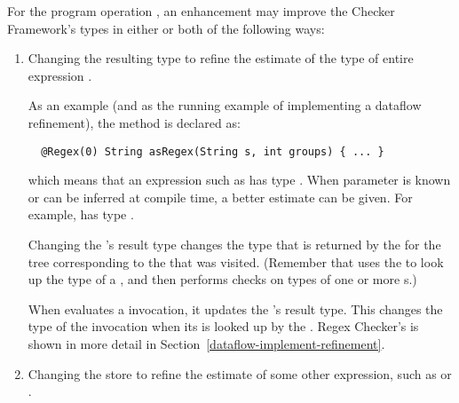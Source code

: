 For the program operation , an enhancement may improve the Checker
Framework's types in either or both of the following ways:
\begin{enumerate}
\item Changing the resulting type to refine the estimate of the type of entire
    expression .

As an example (and as the running example of
implementing a dataflow refinement),
the  method is declared as:

\begin{smaller}
\begin{Verbatim}
  @Regex(0) String asRegex(String s, int groups) { ... }
\end{Verbatim}
\end{smaller}

\noindent
which means that an expression such as 
has type . When  parameter  is
known or can be inferred at compile time, a better estimate can be given.  For
example,  has type .

\begin{sloppypar}
Changing the 's result type changes
the type that is returned by the 
for the tree corresponding to the  that was
visited.  (Remember that  uses the
 to look up the type of a
, and then performs checks on types of one or more
s.)
\end{sloppypar}

When  evaluates a
 invocation, it updates the
's result type. This changes the
type of the  invocation when its
 is looked up by the
.  Regex Checker's
 is shown in more detail in
Section~\ref{dataflow-implement-refinement}.

\item Changing the store to refine the estimate of some other expression, such
    as  or .


\end{enumerate}
